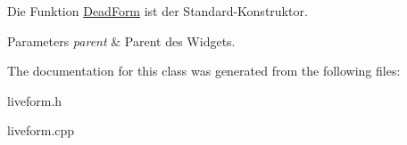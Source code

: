 Die Funktion \hyperlink{class_dead_form}{Dead\+Form} ist der Standard-\/\+Konstruktor. 


\begin{DoxyParams}{Parameters}
{\em parent} & Parent des Widgets. \\
\hline
\end{DoxyParams}


The documentation for this class was generated from the following files\+:\begin{DoxyCompactItemize}
\item 
liveform.\+h\item 
liveform.\+cpp\end{DoxyCompactItemize}
